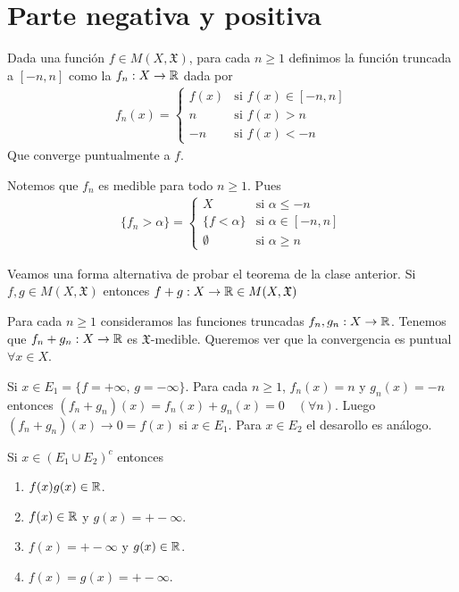 \section{Parte negativa y positiva}

\begin{definition}
    Dada una función $f \in M(X, \mathfrak{X})$, para cada $n \geq 1$ definimos la función truncada a $[-n ,n]$ como la $f_n : X \to \mathbb{R}$ dada por
    \begin{align*}
        f_n(x) = \begin{cases}
                     f(x) & \text{si } f(x) \in [-n, n] \\
                     n    & \text{si } f(x) > n         \\
                     -n   & \text{si } f(x) < -n
                 \end{cases}
    \end{align*}
    Que converge puntualmente a $f$.
\end{definition}

Notemos que $f_n$ es medible para todo $n \geq 1$. Pues \begin{align*}
    \{ f_n > \alpha \} = \begin{cases}
                             X                & \text{si } \alpha \leq -n     \\
                             \{ f < \alpha \} & \text{si } \alpha \in [-n, n] \\
                             \emptyset        & \text{si } \alpha \geq n
                         \end{cases}
\end{align*}

Veamos una forma alternativa de probar el teorema de la clase anterior.
Si $f, g \in M(X, \mathfrak{X})$ entonces $f + g: X \to \mathbb{R} \in M(X, \mathfrak{X})$

Para cada $n \geq 1$ consideramos las funciones truncadas $f_n, g_n : X \to \mathbb{R}$.
Tenemos que $f_n + g_n : X \to \mathbb{R}$ es $\mathfrak{X}$-medible. Queremos ver que la convergencia es puntual $\forall x \in X$.

Si $x \in E_1 = \{ f = +\infty \text{, } g = -\infty \}$. Para cada $n \geq 1$,
$f_n(x) = n$ y $g_n(x) = -n$ entonces $(f_n + g_n)(x) = f_n(x) + g_n(x) = 0 \quad (\forall n)$.
Luego $(f_n + g_n)(x) \to 0 = f(x)$ si $x \in E_1$. Para $x \in E_2$ el desarollo es análogo.

Si $x \in (E_1 \cup E_2)^c$ entonces \begin{enumerate}
    \item $f(x)g(x) \in \mathbb{R}$.
    \item $f(x) \in \mathbb{R}$ y $g(x) = +-\infty$.
    \item $f(x) = +-\infty$ y $g(x) \in \mathbb{R}$.
    \item $f(x) = g(x) = +-\infty$.
\end{enumerate}

